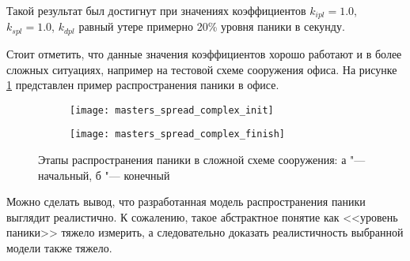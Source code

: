 Такой результат был достигнут при значениях коэффициентов $k_{ipl} = 1.0$, $k_{spl} = 1.0$, $k_{dpl}$ равный утере примерно 20\% уровня паники в секунду.

Стоит отметить, что данные значения коэффициентов хорошо работают и в более сложных ситуациях, например на тестовой схеме сооружения офиса.
На рисунке \ref{sec:results:panic_spread:office} представлен пример распространения паники в офисе.

\begin{figure}[ht!]
  \centering
  \begin{subfigure}[!htb]{1.0\textwidth}
    \centering
    \texttt{[image: masters\_spread\_complex\_init]}
    \caption{}
  \end{subfigure}
  \begin{subfigure}[!htb]{1.0\textwidth}
    \centering
    \texttt{[image: masters\_spread\_complex\_finish]}
    \caption{}
  \end{subfigure}
  \caption{Этапы распространения паники в сложной схеме сооружения: а "--- начальный, б "--- конечный}
  \label{sec:results:panic_spread:office}
\end{figure}

Можно сделать вывод, что разработанная модель распространения паники выглядит реалистично.
К сожалению, такое абстрактное понятие как <<уровень паники>> тяжело измерить,
а следовательно доказать реалистичность выбранной модели также тяжело.
